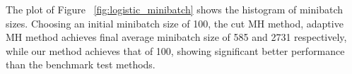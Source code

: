 \documentclass{article}
\begin{document}

The plot of Figure ~\ref{fig:logistic_minibatch} shows the histogram of minibatch sizes. Choosing an initial minibatch size of 100, 
the cut MH method, adaptive MH method achieves final average minibatch size of 585 and 2731 respectively, while our method achieves 
that of 100, showing significant better performance than the benchmark test methods.  


\end{document}
